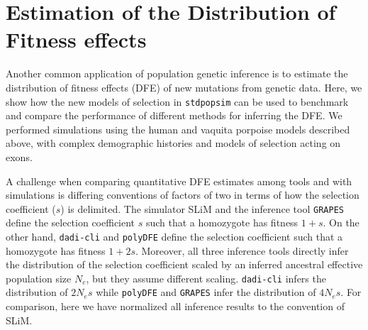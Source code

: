 \documentclass[hidelinks]{article}
\newcommand{\stdpopsim}{\texttt{stdpopsim}\xspace}
\newcommand{\polydfe}{\texttt{polyDFE}\xspace}
\newcommand{\dadicli}{\texttt{dadi-cli}\xspace}
\newcommand{\grapes}{\texttt{GRAPES}\xspace}
\begin{document}
\section*{Estimation of the Distribution of Fitness effects}
    \label{dfe}
    Another common application of population genetic inference is to estimate the distribution of fitness effects (DFE) of new mutations
    from genetic data. Here, we show how the new models of selection in \stdpopsim can be used to benchmark and compare
    the performance of different methods for inferring the DFE. We performed simulations using the 
    human and vaquita porpoise models described above, with complex demographic histories and models of selection acting on exons.
    
    A challenge when comparing quantitative DFE estimates among tools and with simulations is differing conventions of factors of two in terms of how the selection coefficient ($s$) is delimited.
    The simulator SLiM and the inference tool \grapes define the selection coefficient $s$ such that a homozygote has fitness $1+s$.
    On the other hand, \dadicli and \polydfe define the selection coefficient such that a homozygote has fitness $1+ 2s$. %
    Moreover, all three inference tools directly infer the distribution of the selection coefficient scaled by an inferred ancestral effective population size $N_e$, but they assume different scaling.
    \dadicli infers the distribution of $2 N_e s$ while \polydfe and \grapes infer the distribution of $4 N_e s$. %
    For comparison, here we have normalized all inference results to the convention of SLiM.
           		
\end{document}
